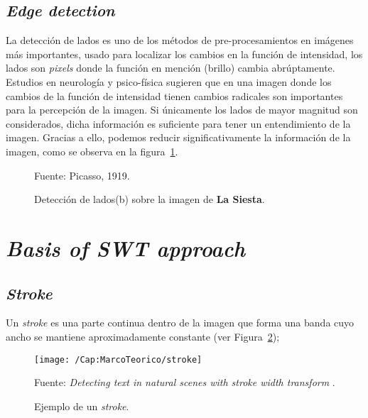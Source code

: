 \subsection{\textit{Edge detection}}
  La detección de lados es uno de los métodos de pre-procesamientos en
  imágenes más importantes, usado para localizar los cambios en la función de 
  intensidad, los lados son \textit{pixels} donde la función en mención
  (brillo) cambia abrúptamente.
  Estudios en neurología y psico-física sugieren que en una imagen donde los
  cambios de la función de intensidad tienen cambios radicales son 
  importantes para la percepción de la imagen. Si únicamente los lados de 
  mayor magnitud son considerados, dicha información es suficiente para tener 
  un entendimiento de la imagen. Gracias a ello, podemos reducir 
  significativamente la información de la imagen, como se observa en la 
  figura~\ref{Fig:Cap-marcoteorico:LaSiesta}.
  \begin{figure}[h!]
    \centering
     { }
    \caption[\textit{Edge detection}]{Detección de lados(b) sobre la imagen
    de \textbf{La Siesta}.}\tiny{Fuente: Picasso, 1919.}
    \label{Fig:Cap-marcoteorico:LaSiesta}
  \end{figure}

\section{\textit{Basis of SWT approach}}

\subsection{\textit{Stroke}}
Un \textit{stroke} es una parte continua dentro de la imagen que forma una
banda cuyo ancho se mantiene aproximadamente constante (ver 
Figura~\ref{Fig:cap-marcoteorico:Stroke});

\begin{figure}[h]
  \centering
  \texttt{[image: /Cap:MarcoTeorico/stroke]}
  \caption{Ejemplo de un \textit{stroke}.}
  \label{Fig:cap-marcoteorico:Stroke}\tiny{Fuente: \textit{Detecting text in 
  natural scenes with stroke width transform} \cite{Epshtein:SWT:2010}.}
\end{figure}


